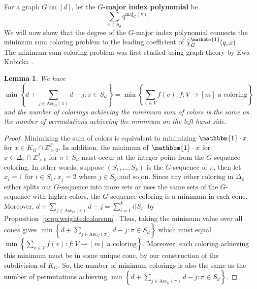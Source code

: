\documentclass[11pt]{amsart}
\newtheorem{lemma}[theorem]{Lemma}
\newcommand\Def[1]{{\bf #1}}
\newcommand{\maj}{\mathrm{maj}}
\newcommand{\asc}{\mathrm{Asc}}
\begin{document}
For a graph $G$ on $[d]$, let the \Def{$G$-major index polynomial} be 
\[
    \sum_{\pi \in S_d} q^{\maj_G(\pi)}.
\]
We will now show that the degree of the $G$-major index polynomial connects the minimum sum coloring problem to the leading coefficient of $\widetilde{\chi}_G^\mathbbm{1}(q,x)$.
The minimum sum coloring problem was first studied using graph theory by Ewa Kubicka \cite{chromaticsums}.

\begin{lemma}\label{lem:minimumandcolorings}
    We have
    \[
        \min\left\{ d+\sum_{j \in \asc_G(\pi)} d-j : \pi \in S_d \right\} = \min\left\{ \sum_{v \in V} f(v): f:V \to [m] \text{ a coloring} \right\}
    \]
    and the number of colorings achieving the minimum sum of colors is the same as the number of permutations
achieving the minimum on the left-hand side. 
\end{lemma}
\begin{proof}
    Minimizing the sum of colors is equivalent to minimizing $\mathbbm{1} \cdot x$ for $x \in K_G \cap \mathbb{Z}_{>0}^d$. In addition, the minimum of $\mathbbm{1} \cdot x$ for $x \in \Delta_\pi \cap \mathbb{Z}_{>0}^d$ for $\pi \in S_d$ must occur at the integer point from the $G$-sequence coloring.
    In other words, suppose $(S_1,\ldots,S_k)$ is the $G$-sequence of $\pi$, then let $x_i = 1$ for $i \in S_1$,
$x_j=2$ where $j \in S_2$ and so on. Since any other coloring in $\Delta_\pi$ either splits our $G$-sequence
into more sets or uses the same sets of the $G$-sequence with higher colors, the $G$-sequence coloring is a
minimum in each cone. 
Moreover, $d + \sum_{j \in \asc_G(\pi)} d-j = \sum_{i=1}^k i |S_i|$ by Proposition~\ref{prop:weightedcolorsum}. 
Thus, taking the minimum value over all cones gives $\min\left\{ d+\sum_{j
\in \asc_G(\pi)} d-j : \pi \in S_d \right\}$ which must equal $\min\left\{ \sum_{v \in V} f(v): f:V \to [m]
\text{ a coloring} \right\}$. Moreover, each coloring achieving this minimum must be in some unique cone, by our
construction of the subdivision of $K_G$. 
So, the number of minimum colorings is also the same as the number of permutations achieving $\min\left\{ d+\sum_{j \in \asc_G(\pi)} d-j : \pi \in S_d \right\}$.
\end{proof}
\end{document}
